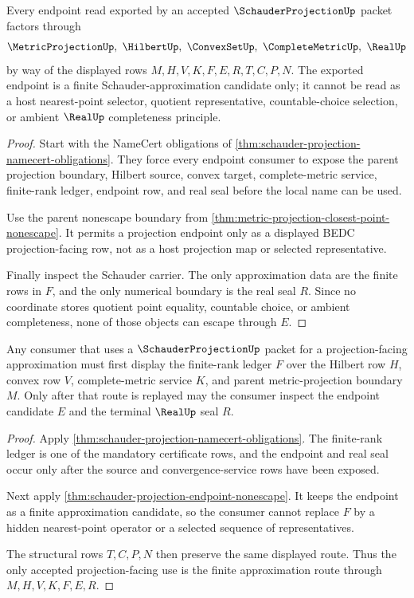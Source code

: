 \begin{theorem}
\label{thm:schauder-projection-endpoint-nonescape}
Every endpoint read exported by an accepted $\SchauderProjectionUp$ packet factors through
$$
\MetricProjectionUp,\ \HilbertUp,\ \ConvexSetUp,\ \CompleteMetricUp,\ \RealUp
$$
by way of the displayed rows $M,H,V,K,F,E,R,T,C,P,N$. The exported endpoint is a finite Schauder-approximation candidate only; it cannot be read as a host nearest-point selector, quotient representative, countable-choice selection, or ambient $\RealUp$ completeness principle.
\end{theorem}
\begin{proof}
Start with the NameCert obligations of \autoref{thm:schauder-projection-namecert-obligations}. They force every endpoint consumer to expose the parent projection boundary, Hilbert source, convex target, complete-metric service, finite-rank ledger, endpoint row, and real seal before the local name can be used.

Use the parent nonescape boundary from \autoref{thm:metric-projection-closest-point-nonescape}. It permits a projection endpoint only as a displayed BEDC projection-facing row, not as a host projection map or selected representative.

Finally inspect the Schauder carrier. The only approximation data are the finite rows in $F$, and the only numerical boundary is the real seal $R$. Since no coordinate stores quotient point equality, countable choice, or ambient completeness, none of those objects can escape through $E$.
\end{proof}

\begin{theorem}
\label{thm:schauder-projection-finite-approximation-route}
Any consumer that uses a $\SchauderProjectionUp$ packet for a projection-facing approximation must first display the finite-rank ledger $F$ over the Hilbert row $H$, convex row $V$, complete-metric service $K$, and parent metric-projection boundary $M$. Only after that route is replayed may the consumer inspect the endpoint candidate $E$ and the terminal $\RealUp$ seal $R$.
\end{theorem}
\begin{proof}
Apply \autoref{thm:schauder-projection-namecert-obligations}. The finite-rank ledger is one of the mandatory certificate rows, and the endpoint and real seal occur only after the source and convergence-service rows have been exposed.

Next apply \autoref{thm:schauder-projection-endpoint-nonescape}. It keeps the endpoint as a finite approximation candidate, so the consumer cannot replace $F$ by a hidden nearest-point operator or a selected sequence of representatives.

The structural rows $T,C,P,N$ then preserve the same displayed route. Thus the only accepted projection-facing use is the finite approximation route through $M,H,V,K,F,E,R$.
\end{proof}

